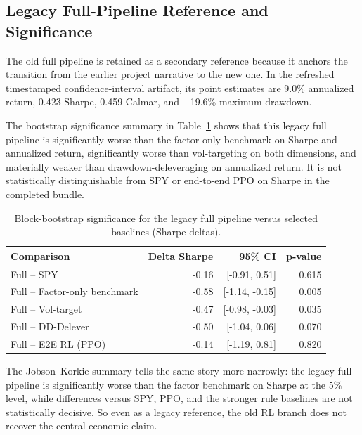 \documentclass[11pt]{article}
\begin{document}
\subsection{Legacy Full-Pipeline Reference and Significance}

The old full pipeline is retained as a secondary reference because it anchors
the transition from the earlier project narrative to the new one. In the
refreshed timestamped confidence-interval artifact, its point estimates are
9.0\% annualized return, 0.423 Sharpe, 0.459 Calmar, and $-$19.6\% maximum
drawdown.

The bootstrap significance summary in Table~\ref{tab:legacy_bootstrap_significance}
shows that this legacy full pipeline is significantly worse than the
factor-only benchmark on Sharpe and annualized return, significantly worse than
vol-targeting on both dimensions, and materially weaker than
drawdown-deleveraging on annualized return. It is not statistically
distinguishable from SPY or end-to-end PPO on Sharpe in the completed bundle.

\begin{table}[t]
\centering
\caption{Block-bootstrap significance for the legacy full pipeline versus
selected baselines (Sharpe deltas).}
\label{tab:legacy_bootstrap_significance}
\begin{tabular}{@{} l r r r @{}}
\toprule
\textbf{Comparison} & \textbf{Delta Sharpe} & \textbf{95\% CI} & \textbf{p-value} \\
\midrule
Full -- SPY                   & -0.16 & [-0.91, 0.51] & 0.615 \\
Full -- Factor-only benchmark & -0.58 & [-1.14, -0.15] & 0.005 \\
Full -- Vol-target            & -0.47 & [-0.98, -0.03] & 0.035 \\
Full -- DD-Delever            & -0.50 & [-1.04, 0.06] & 0.070 \\
Full -- E2E RL (PPO)          & -0.14 & [-1.19, 0.81] & 0.820 \\
\bottomrule
\end{tabular}
\end{table}

The Jobson--Korkie summary tells the same story more narrowly: the legacy full
pipeline is significantly worse than the factor benchmark on Sharpe at the
5\% level, while differences versus SPY, PPO, and the stronger rule baselines
are not statistically decisive. So even as a legacy reference, the old RL
branch does not recover the central economic claim.
\end{document}
